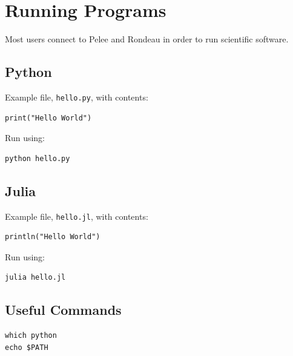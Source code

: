\section{Running Programs}

Most users connect to Pelee and Rondeau in order to run scientific software.

\subsection{Python}

Example file, \texttt{hello.py}, with contents:
\begin{lstlisting}
print("Hello World")
\end{lstlisting}

Run using:

\begin{lstlisting}
python hello.py
\end{lstlisting}

\subsection{Julia}
Example file, \texttt{hello.jl}, with contents:

\begin{lstlisting}
println("Hello World")
\end{lstlisting}

Run using:

\begin{lstlisting}
julia hello.jl
\end{lstlisting}

\subsection{Useful Commands}

\begin{lstlisting}
which python
echo $PATH
\end{lstlisting}
